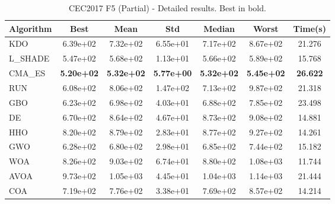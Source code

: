 \begin{table}[H]
\centering\small
\caption{CEC2017 F5 (Partial) - Detailed results. Best in bold.}
\label{tab:cec2017_F5}
\begin{tabular}{lcccccc}
\toprule
\textbf{Algorithm} & \textbf{Best} & \textbf{Mean} & \textbf{Std} & \textbf{Median} & \textbf{Worst} & \textbf{Time(s)} \\
\midrule
KDO & 6.39e+02 & 7.32e+02 & 6.55e+01 & 7.17e+02 & 8.67e+02 & 21.276 \\
L_SHADE & 5.47e+02 & 5.68e+02 & 1.13e+01 & 5.66e+02 & 5.89e+02 & 15.768 \\
CMA_ES & \textbf{5.20e+02} & \textbf{5.32e+02} & \textbf{5.77e+00} & \textbf{5.32e+02} & \textbf{5.45e+02} & \textbf{26.622} \\
RUN & 6.08e+02 & 8.06e+02 & 1.47e+02 & 7.13e+02 & 9.87e+02 & 21.318 \\
GBO & 6.23e+02 & 6.98e+02 & 4.03e+01 & 6.88e+02 & 7.85e+02 & 23.498 \\
DE & 6.70e+02 & 8.64e+02 & 4.67e+01 & 8.73e+02 & 9.08e+02 & 14.881 \\
HHO & 8.20e+02 & 8.79e+02 & 2.83e+01 & 8.77e+02 & 9.27e+02 & 14.261 \\
GWO & 6.28e+02 & 6.80e+02 & 2.98e+01 & 6.85e+02 & 7.44e+02 & 15.182 \\
WOA & 8.26e+02 & 9.03e+02 & 6.74e+01 & 8.80e+02 & 1.08e+03 & 11.744 \\
AVOA & 9.73e+02 & 1.05e+03 & 4.45e+01 & 1.04e+03 & 1.14e+03 & 21.444 \\
COA & 7.19e+02 & 7.76e+02 & 3.38e+01 & 7.69e+02 & 8.57e+02 & 14.214 \\
\bottomrule
\end{tabular}
\end{table}
